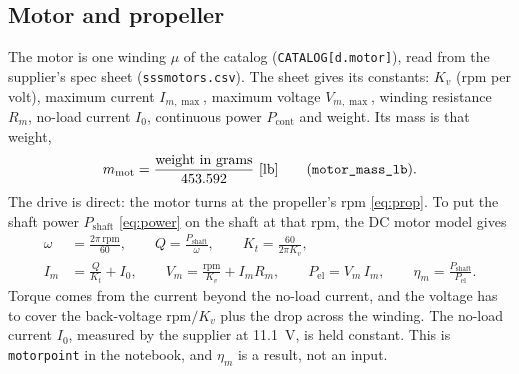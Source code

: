\documentclass[11pt,a4paper]{article}
\renewcommand{\_}{\textunderscore\allowbreak}
\newcommand{\code}[1]{\texttt{#1}}
\newcommand{\Pshaft}{P_{\mathrm{shaft}}}
\begin{document}
\subsection{Motor and propeller}
The motor is one winding $\mu$ of the catalog (\code{CATALOG[d.motor]}), read from the supplier's spec sheet (\code{sss\_motors.csv}). The sheet gives its constants:
$K_v$ (rpm per volt), maximum current $I_{m,\max}$, maximum voltage $V_{m,\max}$, winding resistance $R_m$, no-load current $I_0$, continuous power $P_{\mathrm{cont}}$ and weight. Its mass is that weight,
\begin{equation}
  m_{\mathrm{mot}} = \frac{\text{weight in grams}}{453.592}\ [\mathrm{lb}] \qquad (\code{motor\_mass\_lb}).
  \label{eq:motor}
\end{equation}
The drive is direct: the motor turns at the propeller's rpm \eqref{eq:prop}. To put the shaft power $\Pshaft$ \eqref{eq:power} on the shaft at that rpm, the DC motor model gives
\begin{align}
  \omega &= \frac{2\pi\,\mathrm{rpm}}{60}, \qquad Q = \frac{\Pshaft}{\omega}, \qquad K_t = \frac{60}{2\pi K_v}, \label{eq:dctorque}\\
  I_m &= \frac{Q}{K_t} + I_0, \qquad V_m = \frac{\mathrm{rpm}}{K_v} + I_m R_m, \qquad
  P_{\mathrm{el}} = V_m\,I_m, \qquad \eta_m = \frac{\Pshaft}{P_{\mathrm{el}}}. \label{eq:dcmotor}
\end{align}
Torque comes from the current beyond the no-load current, and the voltage has to cover the back-voltage $\mathrm{rpm}/K_v$ plus the drop across the winding. The no-load current $I_0$, measured by the supplier at 11.1~V,
is held constant. This is \code{motor\_point} in the notebook, and $\eta_m$ is a result, not an input.
\end{document}
